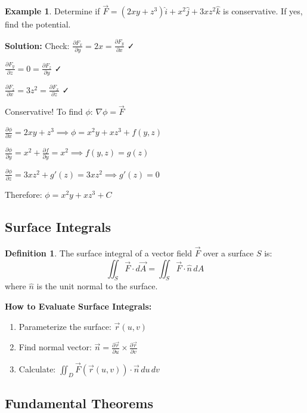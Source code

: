\documentclass[12pt,a4paper]{article}
\theoremstyle{definition}
\newtheorem{definition}[theorem]{Definition}
\newtheorem{example}[theorem]{Example}
\begin{document}
\begin{example}
Determine if $\vec{F} = (2xy + z^3)\hat{i} + x^2\hat{j} + 3xz^2\hat{k}$ is conservative. If yes, find the potential.

\textbf{Solution:}
Check: $\frac{\partial F_x}{\partial y} = 2x = \frac{\partial F_y}{\partial x}$ ✓

$\frac{\partial F_y}{\partial z} = 0 = \frac{\partial F_z}{\partial y}$ ✓

$\frac{\partial F_z}{\partial x} = 3z^2 = \frac{\partial F_x}{\partial z}$ ✓

Conservative! To find $\phi$: $\nabla\phi = \vec{F}$

$\frac{\partial\phi}{\partial x} = 2xy + z^3 \implies \phi = x^2y + xz^3 + f(y,z)$

$\frac{\partial\phi}{\partial y} = x^2 + \frac{\partial f}{\partial y} = x^2 \implies f(y,z) = g(z)$

$\frac{\partial\phi}{\partial z} = 3xz^2 + g'(z) = 3xz^2 \implies g'(z) = 0$

Therefore: $\phi = x^2y + xz^3 + C$
\end{example}

\subsection{Surface Integrals}

\begin{definition}
The surface integral of a vector field $\vec{F}$ over a surface $S$ is:
\[
\iint_S \vec{F} \cdot d\vec{A} = \iint_S \vec{F} \cdot \hat{n}\,dA
\]
where $\hat{n}$ is the unit normal to the surface.
\end{definition}

\begin{tipbox}
\textbf{How to Evaluate Surface Integrals:}
\begin{enumerate}
    \item Parameterize the surface: $\vec{r}(u,v)$
    \item Find normal vector: $\vec{n} = \frac{\partial\vec{r}}{\partial u} \times \frac{\partial\vec{r}}{\partial v}$
    \item Calculate: $\iint_D \vec{F}(\vec{r}(u,v)) \cdot \vec{n}\,du\,dv$
\end{enumerate}
\end{tipbox}

\subsection{Fundamental Theorems}
\end{document}
